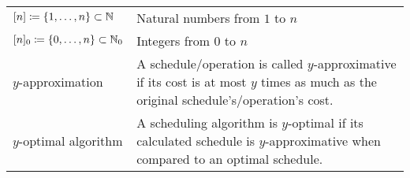 \begin{table}[H]
\begin{tabularx}{\textwidth}{ | >{\centering\arraybackslash}X | >{\arraybackslash}m{} | }
  \hline \multicolumn{2}{|c|}{\textbf{\large Miscellaneous}} \\  
  \hline $[n]\coloneqq\{1,\dotsc,n\}\subset\mathbb{N}$&Natural numbers from $1$ to $n$\\
  \hline $[n]_0\coloneqq\{0,\dotsc,n\}\subset\mathbb{N}_0$&Integers from $0$ to $n$\\
  \hline $y$-approximation&A schedule/operation is called $y$-approximative if its cost is at most $y$ times as much as the original schedule's/operation's cost.\\
  \hline $y$-optimal algorithm&A scheduling algorithm is $y$-optimal if its calculated schedule is $y$-approximative when compared to an optimal schedule.\\
  \hline
\end{tabularx}
\end{table}
